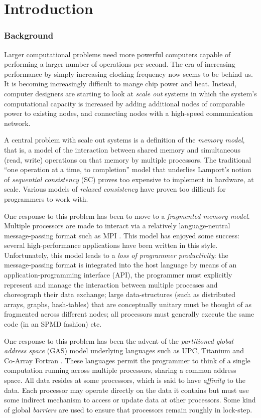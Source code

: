 \chapter{Introduction}

\subsection*{Background}
Larger computational problems need more powerful computers capable of
performing a larger number of operations per second. The era of
increasing performance by simply increasing clocking frequency now
seems to be behind us. It is becoming increasingly difficult
to mange chip power and heat.  Instead, computer
designers are starting to look at {\em scale out} systems in which the
system's computational capacity is increased by adding additional
nodes of comparable power to existing nodes, and connecting nodes with
a high-speed communication network.

A central problem with scale out systems is a definition of the {\em
memory model}, that is, a model of the interaction between shared
memory and  simultaneous (read, write) operations on that
memory by multiple processors. The traditional ``one operation at a
time, to completion'' model that underlies Lamport's notion of {\em
sequential consistency} (SC) proves too expensive to implement in
hardware, at scale. Various models of {\em relaxed consistency} have
proven too difficult for programmers to work with.  

One response to this problem has been to move to a {\em fragmented
memory model}. Multiple processors are made to interact via a
relatively language-neutral message-passing format such as MPI
\cite{mpi}. This model has enjoyed some success: several
high-performance applications have been written in this
style. Unfortunately, this model leads to a {\em loss of programmer
productivity}: the message-passing format is integrated into the host
language by means of an application-programming interface (API), the
programmer must explicitly represent and manage the interaction
between multiple processes and choreograph their data exchange; large
data-structures (such as distributed arrays, graphs, hash-tables) that
are conceptually unitary must be thought of as fragmented across
different nodes; all processors must generally execute the same code
(in an SPMD fashion) etc.

One response to this problem has been the advent of the {\em
partitioned global address space} (GAS) model underlying languages
such as UPC, Titanium and Co-Array Fortran \cite{pgas,titanium}. These
languages permit the programmer to think of a single computation
running across multiple processors, sharing a common address
space. All data resides at some processors, which is said to have {\em
affinity} to the data.  Each processor may operate directly on the
data it contains but must use some indirect mechanism to access or
update data at other processors. Some kind of global {\em barriers}
are used to ensure that processors remain roughly in lock-step.

